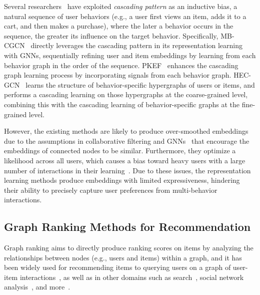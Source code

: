 Several researchers~\cite{LiuXWY00024, YanCGSLSL24, ChengCHLZGP23fqvn} have exploited \textit{cascading pattern} as an inductive bias, a natural sequence of user behaviors (e.g., a user first views an item, adds it to a cart, and then makes a purchase), where the later a behavior occurs in the sequence, the greater its influence on the target behavior.
Specifically, MB-CGCN~\cite{ChengCHLZGP23fqvn} directly leverages the cascading pattern in its representation learning with GNNs, sequentially refining user and item embeddings by learning from each behavior graph in the order of the sequence.
PKEF~\cite{MengMZYZL23} enhances the cascading graph learning process by incorporating signals from each behavior graph.
HEC-GCN~\cite{yin2024hecgcn} learns the structure of behavior-specific hypergraphs of users or items, and performs a cascading learning on those hypergraphs at the coarse-grained level, combining this with the cascading learning of behavior-specific graphs at the fine-grained level.

However, the existing methods are likely to produce over-smoothed embeddings due to the assumptions in collaborative filtering and GNNs~\cite{LiuGJ20,XiaHSX23,LiLCYLLD24} that encourage the embeddings of connected nodes to be similar.
Furthermore, they optimize a likelihood across all users, which causes a bias toward heavy users with a large number of interactions in their learning~\cite{YinCLYC12,abs-2410-04830}.
Due to these issues, the representation learning methods produce embeddings with limited expressiveness, hindering their ability to precisely capture user preferences from multi-behavior interactions.

\subsection{Graph Ranking Methods for Recommendation}
\label{sec:related:graph}
Graph ranking aims to directly produce ranking scores on items by analyzing the relationships between nodes (e.g., users and items) within a graph, and it has been widely used for recommending items to querying users on a graph of user-item interactions~\cite{GoriGP07,DengDLK09kqpg,HeHGKW17}, as well as in other domains such as search~\cite{KleinbergK99,BrinB98}, social network analysis~\cite{HaveliwalaH02, JungJJSK16,JungJK20}, and more~\cite{ValdeolivasVTNPOLCRB19,CowenCIRS17,JinJK19}.


